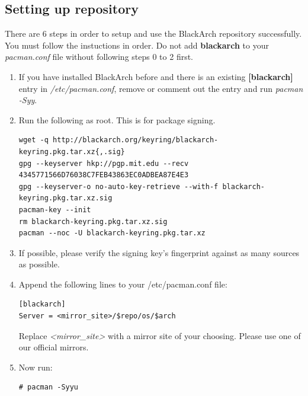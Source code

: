\documentclass[a4paper, oneside, 11pt]{book}
\begin{document}
\subsection{Setting up repository}
There are 6 steps in order to setup and use the BlackArch repository
successfully. You must follow the instuctions in order. Do not add
\textbf{blackarch} to your \textit{pacman.conf} file without following steps 0
to 2 first.
\begin{enumerate}
\item If you have installed BlackArch before and there is an existing
\textbf{[blackarch]} entry in \textit{/etc/pacman.conf}, remove or comment out
the entry and run \textit{pacman -Syy}.
\item Run the following as root. This is for package signing.
{\small
\color{gray}
\begin{verbatim}
wget -q http://blackarch.org/keyring/blackarch-keyring.pkg.tar.xz{,.sig}
gpg --keyserver hkp://pgp.mit.edu --recv 4345771566D76038C7FEB43863EC0ADBEA87E4E3
gpg --keyserver-o no-auto-key-retrieve --with-f blackarch-keyring.pkg.tar.xz.sig
pacman-key --init
rm blackarch-keyring.pkg.tar.xz.sig
pacman --noc -U blackarch-keyring.pkg.tar.xz
\end{verbatim}
}
\item If possible, please verify the signing key's fingerprint against as many
sources as possible.
\item Append the following lines to your /etc/pacman.conf file:
{\small
\color{gray}
\begin{verbatim}
[blackarch]
Server = <mirror_site>/$repo/os/$arch
\end{verbatim}
}
Replace \textit{\textless mirror\_site\textgreater} with a mirror site of your
choosing. Please use one of our official mirrors.
\item Now run:
{\small
\color{gray}
\begin{verbatim}
# pacman -Syyu
\end{verbatim}
}
\end{enumerate}
\end{document}
